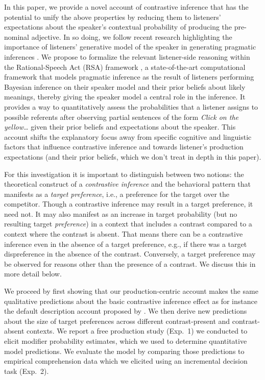 \documentclass[10pt,letterpaper]{article}
\begin{document}
In this paper, we provide a novel account of contrastive inference that has the potential to unify the above properties by reducing them to listeners' expectations about the speaker's contextual probability of producing the pre-nominal adjective. In so doing, we follow recent research highlighting the importance of listeners' generative model of the speaker in generating pragmatic inferences \cite{Hawkins:2018,Kao:2015,Kleinschmidt:2011,Kuperberg:2016,Macdonald:1994,Mitchell:1995,Rubio-Fernandez:2018}. We propose to formalize the relevant listener-side reasoning within the Rational-Speech Act (RSA) framework \cite{Frank:2012, Goodman:2016}, a state-of-the-art computational framework that models pragmatic inference as the result of listeners performing Bayesian inference on their speaker model and their prior beliefs about likely meanings, thereby giving the speaker model a central role in the inference. It provides a way to quantitatively assess the probabilities that a listener assigns to possible referents after observing partial sentences of the form \emph{Click on the yellow\dots} given their prior beliefs and expectations about the speaker. This account shifts the explanatory focus away from specific cognitive and linguistic factors that influence contrastive inference and towards listener's production expectations (and their prior beliefs, which we don't treat in depth in this paper).

For this investigation it is important to distinguish between two notions: the theoretical construct of a \emph{contrastive inference} and the behavioral pattern that manifests as a \emph{target preference}, i.e., a preference for the target over the competitor. Though a contrastive inference may result in a target preference, it need not. It may also manifest as an increase in target probability (but no resulting target \emph{preference}) in a context that includes a contrast compared to a context where the contrast is absent. That means there can be a contrastive inference even in the absence of a target preference, e.g., if there was a target dispreference in the absence of the contrast. Conversely, a target preference may be observed for reasons other than the presence of a contrast. We discuss this in more detail below. 

We proceed by first showing that our production-centric account makes the same qualitative predictions about the basic contrastive inference effect as for instance the default description account proposed by . We then derive new predictions about the size of target preferences across different contrast-present and contrast-absent contexts. We report a free production study (Exp.~1) we conducted to elicit modifier probability estimates, which we used to determine quantitative model predictions. We evaluate the model by comparing those predictions to empirical comprehension data which we elicited using an incremental decision task (Exp.~2).
\end{document}
